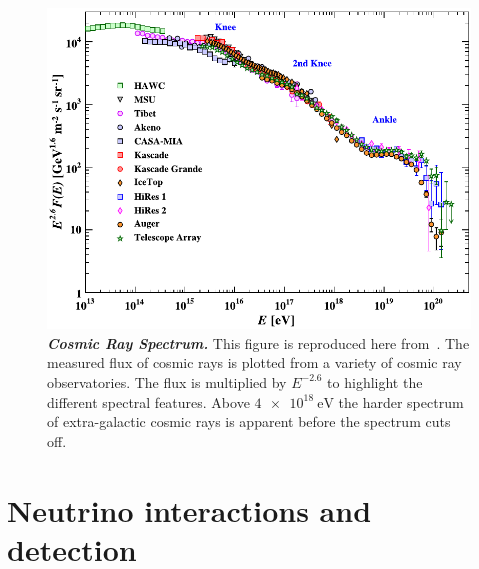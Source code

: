 \begin{figure}
	\centering
	\includegraphics[width=0.8\linewidth]{figures/cosmic_ray_spectrum}
	\internallinenumbers
	\caption{\textbf{\textit{Cosmic Ray Spectrum.}}
		This figure is reproduced here from~\cite{PhysRevD.98.030001}.
		The measured flux of cosmic rays is plotted from a variety of cosmic ray observatories.
		The flux is multiplied by $E^{-2.6}$ to highlight the different spectral features.
		Above $\SI{4e18}\eV$ the harder spectrum of extra-galactic cosmic rays is apparent before the spectrum cuts off.
	}\label{fig:cosmic_ray_spectrum}
\end{figure}

\section{Neutrino interactions and detection}

